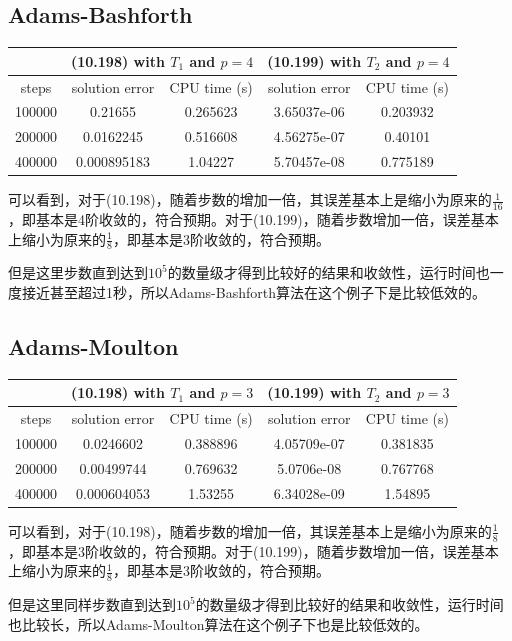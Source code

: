 \documentclass[a4paper,11.5pt,UTF8]{ctexart}
\begin{document}
\begin{large}
\subsection{Adams-Bashforth}
\begin{center}
\begin{tabular}{|c|c|c|c|c|}
    \hline
     & \multicolumn{2}{c|}{(10.198) with $T_1$ and $p=4$} & \multicolumn{2}{c|}{(10.199) with $T_2$ and $p=4$} \\
     \hline
     steps & solution error & CPU time (s) & solution error & CPU time (s) \\
     \hline
     100000 & 0.21655 & 0.265623 & 3.65037e-06 & 0.203932 \\
     \hline
     200000 & 0.0162245 & 0.516608 & 4.56275e-07 & 0.40101 \\
     \hline
     400000 & 0.000895183 & 1.04227 & 5.70457e-08 & 0.775189 \\
     \hline
\end{tabular}
\end{center}
\par 可以看到，对于(10.198)，随着步数的增加一倍，其误差基本上是缩小为原来的$\frac{1}{16}$，即基本是4阶收敛的，符合预期。对于(10.199)，随着步数增加一倍，误差基本上缩小为原来的$\frac{1}{8}$，即基本是3阶收敛的，符合预期。
\par 但是这里步数直到达到$10^5$的数量级才得到比较好的结果和收敛性，运行时间也一度接近甚至超过1秒，所以Adams-Bashforth算法在这个例子下是比较低效的。

\subsection{Adams-Moulton}
\begin{center}
\begin{tabular}{|c|c|c|c|c|}
    \hline
     & \multicolumn{2}{c|}{(10.198) with $T_1$ and $p=3$} & \multicolumn{2}{c|}{(10.199) with $T_2$ and $p=3$} \\
     \hline
     steps & solution error & CPU time (s) & solution error & CPU time (s) \\
     \hline
     100000 & 0.0246602 & 0.388896 & 4.05709e-07 & 0.381835 \\
     \hline
     200000 & 0.00499744 & 0.769632 & 5.0706e-08 & 0.767768 \\
     \hline
     400000 & 0.000604053 & 1.53255 & 6.34028e-09 & 1.54895 \\
     \hline
\end{tabular}
\end{center}
\par 可以看到，对于(10.198)，随着步数的增加一倍，其误差基本上是缩小为原来的$\frac{1}{8}$，即基本是3阶收敛的，符合预期。对于(10.199)，随着步数增加一倍，误差基本上缩小为原来的$\frac{1}{8}$，即基本是3阶收敛的，符合预期。
\par 但是这里同样步数直到达到$10^5$的数量级才得到比较好的结果和收敛性，运行时间也比较长，所以Adams-Moulton算法在这个例子下也是比较低效的。


\end{large}
\end{document}
